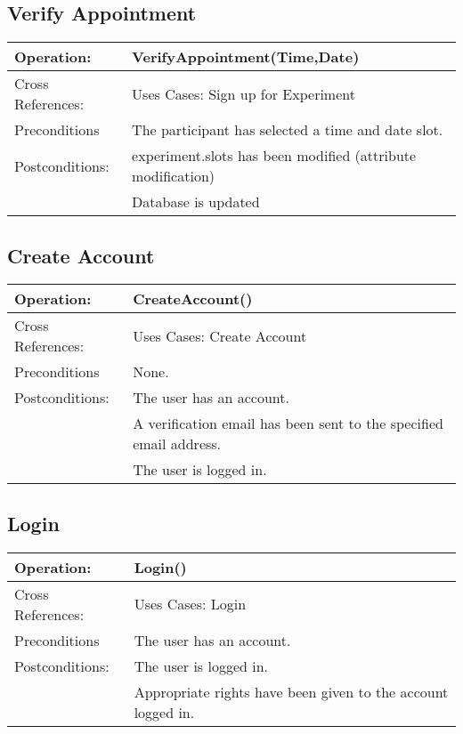 \subsection{Verify Appointment}
\begin{tabular}{|l|l|}
\hline Operation: & VerifyAppointment(Time,Date) \\ 
\hline Cross References: & Uses Cases: Sign up for Experiment \\ 
\hline Preconditions & The participant has selected a time and date slot. \\ 
\hline Postconditions: & experiment.slots has been modified (attribute modification) \\
\hline & Database is updated \\
\hline 
\end{tabular}

\subsection{Create Account}
\begin{tabular}{|l|l|}
\hline Operation: & CreateAccount() \\ 
\hline Cross References: & Uses Cases: Create Account \\ 
\hline Preconditions & None. \\ 
\hline Postconditions: & The user has an account. \\
\hline & A verification email has been sent to the specified email address.  \\
\hline & The user is logged in. \\
\hline 
\end{tabular}

\subsection{Login}
\begin{tabular}{|l|l|}
\hline Operation: & Login() \\ 
\hline Cross References: & Uses Cases: Login \\ 
\hline Preconditions & The user has an account. \\ 
\hline Postconditions: & The user is logged in. \\
\hline & Appropriate rights have been given to the account logged in. \\
\hline 
\end{tabular}